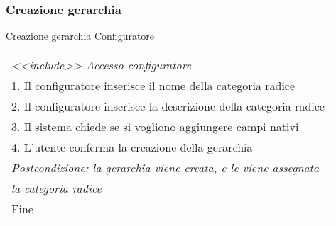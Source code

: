 \begin{minipage}{\textwidth}
    \subsubsection{Creazione gerarchia}
    \usecase
        {Creazione gerarchia}
        {Configuratore}
        {
            \begin{tabular}{l}
                \textit{<<include>> Accesso configuratore}\\
                1.  Il configuratore inserisce il nome della categoria radice\\
                2.  Il configuratore inserisce la descrizione della categoria radice \\
                3.  Il sistema chiede se si vogliono aggiungere campi nativi\\
                4.  L'utente conferma la creazione della gerarchia\\
                \textit{Postcondizione: la gerarchia viene creata, e le viene assegnata}\\
                \textit{la categoria radice}\\
                Fine
            \end{tabular}\\
             \\
            }
\end{minipage}
